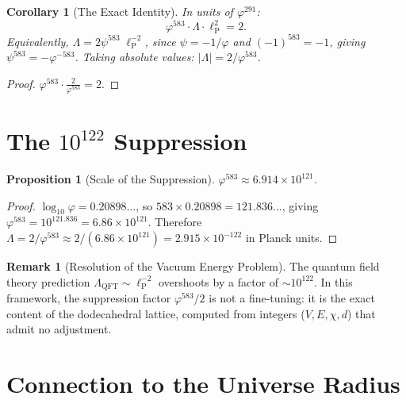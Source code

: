 \documentclass[11pt,a4paper]{article}
\theoremstyle{plain}
\newtheorem{proposition}[theorem]{Proposition}
\newtheorem{corollary}[theorem]{Corollary}
\theoremstyle{definition}
\newtheorem{remark}[theorem]{Remark}
\newcommand{\lP}{\ell_{\mathrm{P}}}
\newcommand{\vp}{\varphi}
\begin{document}
\begin{corollary}[The Exact Identity]\label{cor:exact}
In units of $\vp^{291}$:
\[
  \vp^{583} \cdot \Lambda \cdot \lP^2 = 2.
\]
Equivalently, $\Lambda = 2\psi^{583}\;\lP^{-2}$, since
$\psi = -1/\vp$ and $(-1)^{583} = -1$, giving
$\psi^{583} = -\vp^{-583}$.  Taking absolute values:
$|\Lambda| = 2/\vp^{583}$.
\end{corollary}

\begin{proof}
$\vp^{583} \cdot \frac{2}{\vp^{583}} = 2$.
\end{proof}

\section{The $10^{122}$ Suppression}\label{sec:suppression}

\begin{proposition}[Scale of the Suppression]\label{prop:scale}
$\vp^{583} \approx 6.914 \times 10^{121}$.
\end{proposition}

\begin{proof}
$\log_{10}\vp = 0.20898\ldots$, so
$583 \times 0.20898 = 121.836\ldots$, giving
$\vp^{583} = 10^{121.836} = 6.86 \times 10^{121}$.
Therefore $\Lambda = 2/\vp^{583} \approx 2/(6.86 \times 10^{121})
= 2.915 \times 10^{-122}$ in Planck units.
\end{proof}

\begin{remark}[Resolution of the Vacuum Energy Problem]\label{rem:vacuum}
The quantum field theory prediction $\Lambda_{\mathrm{QFT}} \sim \lP^{-2}$
overshoots by a factor of $\sim 10^{122}$.  In this framework, the
suppression factor $\vp^{583}/2$ is not a fine-tuning: it is the
exact content of the dodecahedral lattice, computed from integers
($V, E, \chi, d$) that admit no adjustment.
\end{remark}

\section{Connection to the Universe Radius}\label{sec:radius}
\end{document}
